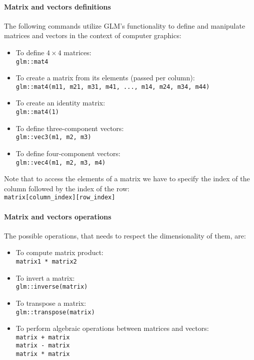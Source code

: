 \paragraph*{Matrix and vectors definitions}
The following commands utilize GLM's functionality to define and manipulate matrices and vectors in the context of computer graphics:
\begin{itemize}
    \item To define $4 \times 4$ matrices: \\
        \texttt{glm::mat4}
    \item To create a matrix from its elements (passed per column): \\
        \texttt{glm::mat4(m11, m21, m31, m41, ..., m14, m24, m34, m44)}
    \item To create an identity matrix: \\
        \texttt{glm::mat4(1)}
    \item To define three-component vectors: \\
        \texttt{glm::vec3(m1, m2, m3)}
    \item To define four-component vectors: \\
        \texttt{glm::vec4(m1, m2, m3, m4)} 
\end{itemize}
Note that to access the elements of a matrix we have to specify the index of the column followed by the index of the row: \\
\texttt{matrix[column\_index][row\_index]} 

\paragraph*{Matrix and vectors operations}
The possible operations, that needs to respect the dimensionality of them, are: 
\begin{itemize}
    \item To compute matrix product: \\ 
        \texttt{matrix1 * matrix2}
    \item To invert a matrix: \\ 
        \texttt{glm::inverse(matrix)}
    \item To transpose a matrix: \\ 
        \texttt{glm::transpose(matrix)}
    \item To perform algebraic operations between matrices and vectors: \\ 
        \texttt{matrix + matrix} \\
        \texttt{matrix - matrix} \\
        \texttt{matrix * matrix} 
\end{itemize}

